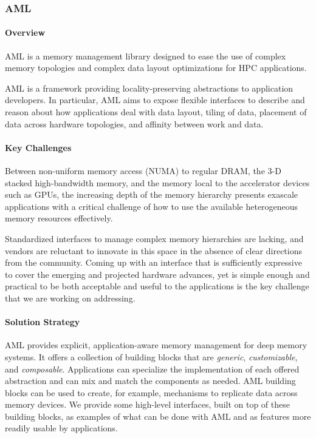 \subsubsection*{AML}

\paragraph{Overview}

AML is a memory management library designed to ease the use of complex
memory topologies and complex data layout optimizations for
HPC applications.

AML is a framework providing locality-preserving abstractions to
application developers.  In particular, AML aims to expose flexible
interfaces to describe and reason about how applications deal with data
layout, tiling of data, placement of data across hardware topologies, and
affinity between work and data.

\paragraph{Key Challenges}

Between non-uniform memory access (NUMA) to regular DRAM, the 3-D stacked
high-bandwidth memory, and the memory local to the accelerator devices such
as GPUs, the increasing depth of the memory hierarchy presents exascale
applications with a critical challenge of how to use the available
heterogeneous memory resources effectively.

Standardized interfaces to manage complex memory hierarchies are lacking,
and vendors are reluctant to innovate in this space in the absence of clear
directions from the community.  Coming up with an interface that is
sufficiently expressive to cover the emerging and projected hardware
advances, yet is simple enough and practical to be both acceptable and
useful to the applications is the key challenge that we are working on
addressing.

\paragraph{Solution Strategy}

AML provides explicit, application-aware memory management for deep memory
systems.  It offers a collection of building blocks that
are \emph{generic}, \emph{customizable}, and \emph{composable}.
Applications can specialize the implementation of each offered abstraction
and can mix and match the components as needed.  AML building blocks can be
used to create, for example, mechanisms to replicate data across memory
devices. We provide some high-level interfaces, built on top of these
building blocks, as examples of what can be done with AML and as features
more readily usable by applications. 

